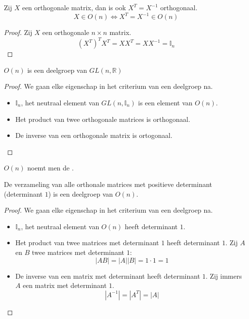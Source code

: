 \documentclass[main.tex]{subfiles}
\begin{document}
\begin{st}
  \label{st:inverse-orthogonale-matrix-orthogonaal}
  Zij $X$ een orthogonale matrix, dan is ook $X^{T}=X^{-1}$ orthogonaal.
  \[ X \in O(n) \Leftrightarrow X^{T} = X^{-1} \in O(n)\]

  \begin{proof}
    Zij $X$ een orthogonale $n\times n$ matrix.
    \[ (X^{T})^{T}X^{T} = XX^{T} = XX^{-1} = \mathbb{I}_{n} \]
  \end{proof}
\end{st}

\begin{st}
  $O(n)$ is een deelgroep van $GL(n,\mathbb{R})$

  \begin{proof}
    We gaan elke eigenschap in het criterium van een deelgroep na.
    \begin{itemize}
    \item $\mathbb{I}_{n}$, het neutraal element van $GL(n,\mathbb{I}_{n})$ is een element van $O(n)$.
    \item Het product van twee orthogonale matrices is orthogonaal.
    \item De inverse van een orthogonale matrix is ortogonaal.
    \end{itemize}
  \end{proof}
\end{st}

\begin{de}
  $O(n)$ noemt men de .
\end{de}

\begin{st}
  De verzameling van alle orthonale matrices met positieve determinant (determinant $1$) is een deelgroep van $O(n)$.

  \begin{proof}
    We gaan elke eigenschap in het criterium van een deelgroep na.
    \begin{itemize}
    \item $\mathbb{I}_{n}$, het neutraal element van $O(n)$ heeft determinant $1$.
    \item Het product van twee matrices met determinant $1$ heeft determinant $1$.
      Zij $A$ en $B$ twee matrices met determinant $1$:
      \[ |AB| = |A||B| = 1\cdot 1 = 1 \]
    \item De inverse van een matrix met determinant heeft determinant $1$.
      Zij immers $A$ een matrix met determinant $1$.
      \[ |A^{-1}| = |A^{T}| = |A| \]
    \end{itemize}
  \end{proof}
\end{st}
\end{document}
